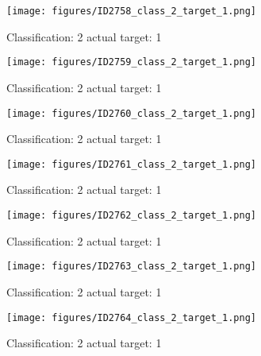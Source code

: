 \begin{figure}[h!]
\begin{center}
\texttt{[image: figures/ID2758\_class\_2\_target\_1.png]}
\end{center}
\caption{ Classification: 2 actual target: 1}
\label{fig:ID2758_class_2_target_1}
\end{figure}
\begin{figure}[h!]
\begin{center}
\texttt{[image: figures/ID2759\_class\_2\_target\_1.png]}
\end{center}
\caption{ Classification: 2 actual target: 1}
\label{fig:ID2759_class_2_target_1}
\end{figure}
\begin{figure}[h!]
\begin{center}
\texttt{[image: figures/ID2760\_class\_2\_target\_1.png]}
\end{center}
\caption{ Classification: 2 actual target: 1}
\label{fig:ID2760_class_2_target_1}
\end{figure}
\begin{figure}[h!]
\begin{center}
\texttt{[image: figures/ID2761\_class\_2\_target\_1.png]}
\end{center}
\caption{ Classification: 2 actual target: 1}
\label{fig:ID2761_class_2_target_1}
\end{figure}
\begin{figure}[h!]
\begin{center}
\texttt{[image: figures/ID2762\_class\_2\_target\_1.png]}
\end{center}
\caption{ Classification: 2 actual target: 1}
\label{fig:ID2762_class_2_target_1}
\end{figure}
\begin{figure}[h!]
\begin{center}
\texttt{[image: figures/ID2763\_class\_2\_target\_1.png]}
\end{center}
\caption{ Classification: 2 actual target: 1}
\label{fig:ID2763_class_2_target_1}
\end{figure}
\begin{figure}[h!]
\begin{center}
\texttt{[image: figures/ID2764\_class\_2\_target\_1.png]}
\end{center}
\caption{ Classification: 2 actual target: 1}
\label{fig:ID2764_class_2_target_1}
\end{figure}
